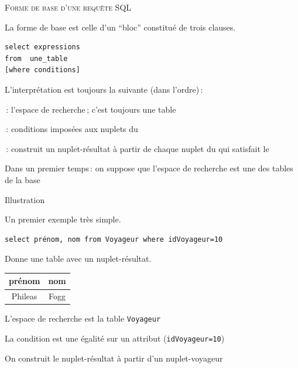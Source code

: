 

\begin{frame}[fragile]{\textsc{Forme de base d'une requête SQL}}

La forme de base est celle d'un ``bloc'' constitué de 
trois \alert{clauses}.

\vfill

\begin{verbatim}
select expressions
from  une_table
[where conditions]
\end{verbatim}

\vfill

L'interprétation est \alert{toujours} la suivante (dans l'ordre)\,:

\begin{redbullet}
   \item {}\,: \alert{l'espace de recherche}\,; c'est toujours une table
     \item {}\,: \alert{conditions} imposées aux nuplets
            du 
       \item {}\,: construit un  \alert{nuplet-résultat} à partir de chaque nuplet
          du  qui satisfait le 
\end{redbullet}

\vfill

Dans un premier temps\,: on suppose que l'espace de recherche est une des tables de la base
\end{frame}


\begin{frame}[fragile]{Illustration}


Un premier exemple très simple.
\vfill

\begin{verbatim}
select prénom, nom from Voyageur where idVoyageur=10
\end{verbatim}

\vfill

Donne une table avec un nuplet-résultat.

\vfill

\begin{tabular}{c|c}
\textbf{prénom} & \textbf{nom}\\ \hline 
Phileas & Fogg\\ \hline 
\end{tabular}

\vfill 

\begin{redbullet}
   \item L'espace de recherche est la table \texttt{Voyageur}
     \item La condition est une égalité sur un attribut (\texttt{idVoyageur=10})
     \item On construit le nuplet-résultat à partir d'un nuplet-voyageur
\end{redbullet}

\end{frame}


